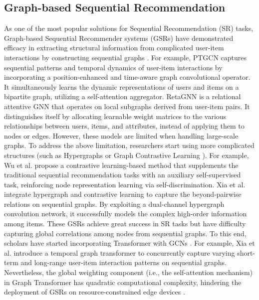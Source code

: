 \subsection{Graph-based Sequential Recommendation}
\noindent As one of the most popular solutions for Sequential Recommendation (SR) tasks, Graph-based Sequential Recommender systems (GSRs) have demonstrated efficacy in extracting structural information from complicated user-item interactions by constructing sequential graphs \cite{ZhangLXXLHCM22, ChangGZHNSJ021}. For example, PTGCN \cite{HuangMLDWL23} captures sequential patterns and temporal dynamics of user-item interactions by incorporating a position-enhanced and time-aware graph convolutional operator. It simultaneously learns the dynamic representations of users and items on a bipartite graph, utilizing a self-attention aggregator. RetaGNN \cite{HsuL21} is a relational attentive GNN that operates on local subgraphs derived from user-item pairs. It distinguishes itself by allocating learnable weight matrices to the various relationships between users, items, and attributes, instead of applying them to nodes or edges.
However, these models are limited when handling large-scale graphs. 
To address the above limitation, researchers start using more complicated structures (such as Hypergraphs \cite{xia_self_AAAI_2021} or Graph Contrastive Learning \cite{WuWF0CLX21}).
For example, Wu et al. \cite{WuWF0CLX21} propose a contrastive learning-based method that supplements the traditional sequential recommendation tasks with an auxiliary self-supervised task, reinforcing node representation learning via self-discrimination.
Xia et al. \cite{xia_self_AAAI_2021} integrate hypergraph and contrastive learning to capture the beyond-pairwise relations on sequential graphs. By exploiting a dual-channel hypergraph convolution network, it successfully models the complex high-order information among items. 
These GSRs achieve great success in SR tasks but have difficulty capturing global correlations among nodes from sequential graphs. To this end, scholars have started incorporating Transformer with GCNs \cite{XiaHXP23, LiXRY0023}. For example, Xia et al. \cite{XiaHXP23} introduce a temporal graph transformer to concurrently capture varying short-term and long-range user-item interaction patterns on sequential graphs. Nevertheless, the global weighting component (i.e., the self-attention mechanism) in Graph Transformer has quadratic computational complexity, hindering the deployment of GSRs on resource-constrained edge devices \cite{lea23dasfaa}.

